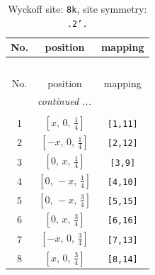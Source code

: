 \documentclass[fleqn,8pt]{jsarticle}
\begin{document}
\begin{longtable}{ccc}
\caption{Wyckoff site: {\tt 8k}, site symmetry: {\tt .2'.}}
 \\
 \hline \hline
No. & position & mapping \\ \hline \endfirsthead

\multicolumn{2}{l}{\tablename\ \thetable{}} \\
 \hline \hline
No. & position & mapping \\ \hline \endhead

 \hline \hline
\multicolumn{2}{r}{\footnotesize\it continued ...} \\ \endfoot

 \hline \hline
\multicolumn{2}{r}{} \\ \endlastfoot

1 & $\left[ x,\, 0,\, \frac{1}{4} \right]$ & {\tt [1,11]} \\ \hline
2 & $\left[ - x,\, 0,\, \frac{1}{4} \right]$ & {\tt [2,12]} \\ \hline
3 & $\left[ 0,\, x,\, \frac{1}{4} \right]$ & {\tt [3,9]} \\ \hline
4 & $\left[ 0,\, - x,\, \frac{1}{4} \right]$ & {\tt [4,10]} \\ \hline
5 & $\left[ 0,\, - x,\, \frac{3}{4} \right]$ & {\tt [5,15]} \\ \hline
6 & $\left[ 0,\, x,\, \frac{3}{4} \right]$ & {\tt [6,16]} \\ \hline
7 & $\left[ - x,\, 0,\, \frac{3}{4} \right]$ & {\tt [7,13]} \\ \hline
8 & $\left[ x,\, 0,\, \frac{3}{4} \right]$ & {\tt [8,14]} \\
\end{longtable}
\renewcommand{\arraystretch}{1.2}
\end{document}
